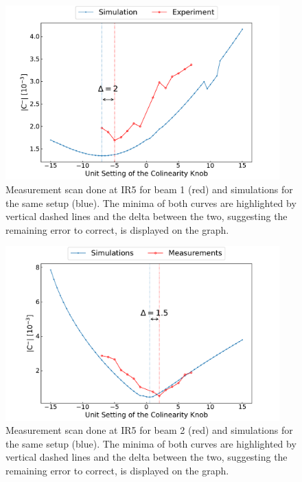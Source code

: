 \begin{figure}[!htb]
    \centering
    \includegraphics*[width=0.94\textwidth]{Figures/IR_Coupling_Correction/rws_measurement_ir5_b1_pos.pdf}
    \caption{Measurement scan done at IR\num{5} for beam \num{1} (\textcolor{mplr}{red}) and simulations for the same setup (\textcolor{mplblue}{blue}). The minima of both curves are highlighted by vertical dashed lines and the delta between the two, suggesting the remaining error to correct, is displayed on the graph.}
    \label{figure:ir5_b1_pos_measurement}
\end{figure}

\begin{figure}[!htb]
    \centering
    \includegraphics*[width=0.94\textwidth]{Figures/IR_Coupling_Correction/rws_measurement_ir5_b2_pos.pdf}
    \caption{Measurement scan done at IR\num{5} for beam \num{2} (\textcolor{mplr}{red}) and simulations for the same setup (\textcolor{mplblue}{blue}). The minima of both curves are highlighted by vertical dashed lines and the delta between the two, suggesting the remaining error to correct, is displayed on the graph.}
    \label{figure:ir5_b2_pos_measurement}
\end{figure}

